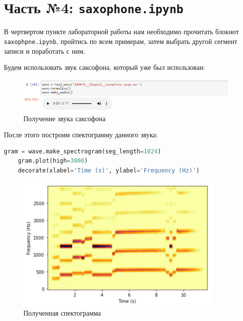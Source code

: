 \documentclass[a4paper]{article}
\begin{document}
    \newpage
        \section{Часть №4: \texttt{saxophone.ipynb}}
            В чертвертом пункте лабораторной работы нам необходимо прочитать блокнот \texttt{saxophpne.ipynb}, пройтись по всем примерам, затем выбрать другой сегмент записи и поработать с ним.
            
            Будем использовать звук саксофона, который уже был использован:
            
            \begin{figure}[H]
                \centering
                \includegraphics[width=\textwidth]{ex_4_wave_audio.png}
                \caption{Получение звука саксофона}
                \label{fig:ex_4_wave_audio}
            \end{figure}
            
            После этого построим спектограмму данного звука:
            
\begin{lstlisting}[language=Python, caption= Построение спектограммы]
    gram = wave.make_spectrogram(seg_length=1024)
    gram.plot(high=3000)
    decorate(xlabel='Time (s)', ylabel='Frequency (Hz)')
\end{lstlisting}               
            
            \begin{figure}[H]
                \centering
                \includegraphics{ex_4_spectogramma.png}
                \caption{Полученная спектограмма}
                \label{fig:ex_4_spectogramma}
            \end{figure}
            
\end{document}
